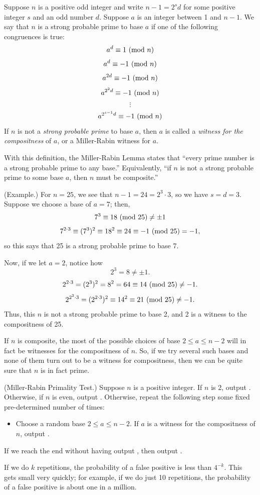 \documentclass[letterpaper]{article}
\begin{document}
\begin{definition}{}{}
    Suppose $n$ is a positive odd integer and write $n - 1 = 2^s d$ for some positive integer $s$ and an odd number $d$. Suppose $a$ is an integer between 1 and $n - 1$. We say that $n$ is a strong probable prime to base $a$ if one of the following congruences is true: 
    \[a^d \equiv 1 \ (\mathrm{mod}\ n)\]
    \[a^d \equiv -1 \ (\mathrm{mod}\ n)\]
    \[a^{2d} \equiv -1 \ (\mathrm{mod}\ n)\]
    \[a^{2^2 d} \equiv -1 \ (\mathrm{mod}\ n)\]
    \[\vdots\]
    \[a^{2^{s - 1} d} \equiv -1 \ (\mathrm{mod}\ n)\]
    If $n$ is not a \emph{strong probable prime} to base $a$, then $a$ is called a \emph{witness for the compositness} of $a$, or a Miller-Rabin witness for $a$. 
\end{definition}
With this definition, the Miller-Rabin Lemma states that ``every prime number is a strong probable prime to any base.'' Equivalently, ``if $n$ is not a strong probable prime to some base $a$, then $n$ must be composite.''

\begin{mdframed}
    (Example.) For $n = 25$, we see that $n - 1 = 24 = 2^3 \cdot 3$, so we have $s = d = 3$. Suppose we choose a base of $a = 7$; then, 
    \[7^3 \equiv 18 \ (\mathrm{mod}\ 25) \neq \pm 1\]
    \[7^{2 \cdot 3} \equiv (7^3)^2 \equiv 18^2 \equiv 24 \equiv -1 \ (\mathrm{mod}\ 25) = -1,\]
    so this says that 25 is a strong probable prime to base 7.

    \bigskip 

    Now, if we let $a = 2$, notice how 
    \[2^3 = 8 \neq \pm 1.\]
    \[2^{2 \cdot 3} = (2^3)^2 = 8^2 = 64 \equiv 14 \ (\mathrm{mod}\ 25) \neq -1.\]
    \[2^{2^2 \cdot 3} = (2^{2 \cdot 3})^2 \equiv 14^2 \equiv 21 \ (\mathrm{mod}\ 25) \neq -1.\]
    Thus, this $n$ is not a strong probable prime to base 2, and 2 is a witness to the compositness of 25. 
\end{mdframed}
If $n$ is composite, the most of the possible choices of base $2 \leq a \leq n - 2$ will in fact be witnesses for the compositness of $n$. So, if we try several such bases and none of them turn out to be a witness for compositness, then we can be quite sure that $n$ is in fact prime. 

\begin{mdframed}
    (Miller-Rabin Primality Test.) Suppose $n$ is a positive integer. If $n$ is 2, output . Otherwise, if $n$ is even, output . Otherwise, repeat the following step some fixed pre-determined number of times: 
    \begin{itemize}
        \item Choose a random base $2 \leq a \leq n - 2$. If $a$ is a witness for the compositness of $n$, output . 
    \end{itemize}
    If we reach the end without having output , then output .
\end{mdframed}
If we do $k$ repetitions, the probability of a false positive is less than $4^{-k}$. This gets small very quickly; for example, if we do just 10 repetitions, the probability of a false positive is about one in a million.
\end{document}
